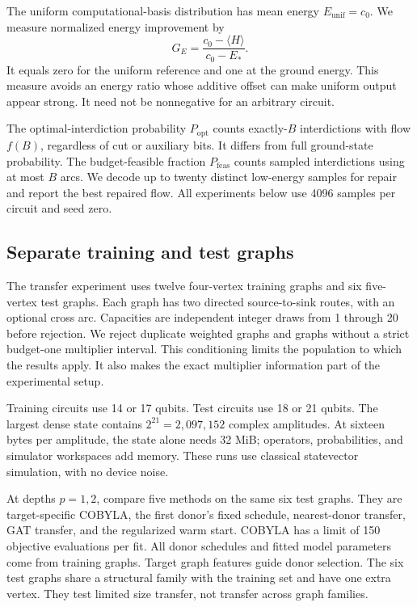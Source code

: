 \documentclass[review,onefignum,onetabnum]{siamart171218}
\begin{document}
The uniform computational-basis distribution has mean energy $E_{\mathrm{unif}}=c_0$.
We measure normalized energy improvement by
\begin{equation}\label{eq:gap}
 G_E=\frac{c_0-\langle H\rangle}{c_0-E_*}.
\end{equation}
It equals zero for the uniform reference and one at the ground energy.
This measure avoids an energy ratio whose additive offset can make uniform output appear strong.
It need not be nonnegative for an arbitrary circuit.

The optimal-interdiction probability $P_{\mathrm{opt}}$ counts exactly-$B$ interdictions with flow $f(B)$, regardless of cut or auxiliary bits.
It differs from full ground-state probability.
The budget-feasible fraction $P_{\mathrm{feas}}$ counts sampled interdictions using at most $B$ arcs.
We decode up to twenty distinct low-energy samples for repair and report the best repaired flow.
All experiments below use 4096 samples per circuit and seed zero.

\subsection{Separate training and test graphs}
The transfer experiment uses twelve four-vertex training graphs and six five-vertex test graphs.
Each graph has two directed source-to-sink routes, with an optional cross arc.
Capacities are independent integer draws from 1 through 20 before rejection.
We reject duplicate weighted graphs and graphs without a strict budget-one multiplier interval.
This conditioning limits the population to which the results apply.
It also makes the exact multiplier information part of the experimental setup.

Training circuits use 14 or 17 qubits.
Test circuits use 18 or 21 qubits.
The largest dense state contains $2^{21}=2{,}097{,}152$ complex amplitudes.
At sixteen bytes per amplitude, the state alone needs 32 MiB; operators, probabilities, and simulator workspaces add memory.
These runs use classical statevector simulation, with no device noise.

At depths $p=1,2$, compare five methods on the same six test graphs.
They are target-specific COBYLA, the first donor's fixed schedule, nearest-donor transfer, GAT transfer, and the regularized warm start.
COBYLA has a limit of 150 objective evaluations per fit.
All donor schedules and fitted model parameters come from training graphs.
Target graph features guide donor selection.
The six test graphs share a structural family with the training set and have one extra vertex.
They test limited size transfer, not transfer across graph families.
\end{document}
